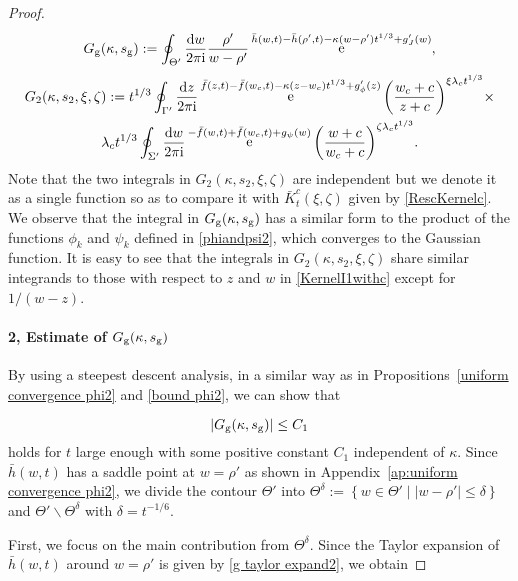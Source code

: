 \documentclass[cmp]{svjour}
\numberwithin{theorem}{section}
\numberwithin{equation}{section}
\DeclareMathOperator{\e}{e}
\def\dd{{\rm d}}
\def\ii{{\rm i}}
\begin{document}
\begin{proof}
\begin{equation}
\label{Gaussian_part}
G_{\rm g}(\kappa, s_{\rm g}) := \oint_{\Theta'} \frac{\dd w}{2 \pi \ii} \frac{\rho'}{w - \rho'}  \e^{\bar{h}(w,t)-\bar{h}(\rho',t) - \kappa (w - \rho') t^{1/3} + g'_J(w)},
\end{equation}
\begin{multline}
\label{Airy_parts}
G_2(\kappa, s_2, \xi , \zeta) := t^{1/3} \oint_{\Gamma'}  \frac{\dd z}{2 \pi \ii}  \e^{\bar{f}(z,t)-\bar{f}(w_c,t) - \kappa (z - w_c) t^{1/3} + g'_{\phi}(z)}  {\left( \frac{w_c + c}{z + c} \right)}^{\xi \lambda_c t^{1/3}} \times \\ \lambda_c t^{1/3} \oint_{\Sigma'} \frac{\dd w}{2 \pi \ii} \e^{-\bar{f}(w,t) + \bar{f}(w_c,t) + g_{\psi}(w)} {\left( \frac{w+c}{w_c + c} \right)}^{\zeta \lambda_c t^{1/3}}.
\end{multline}
Note that the two integrals in $G_2(\kappa, s_2 , \xi, \zeta)$ are independent but we denote it as a single function so as to compare it with $\bar{K}^c_{t}(\xi, \zeta)$ given by \eqref{RescKernelc}.
We observe that the integral in  $G_{\rm g}(\kappa, s_{\rm g})$ has a similar form to the product of the functions $\phi_k$ and $\psi_k$ defined in \eqref{phiandpsi2}, which converges to the Gaussian function.
It is easy to see that the integrals in $G_2(\kappa, s_2 , \xi, \zeta)$ share similar integrands to those with respect to $z$ and $w$ in \eqref{KernelI1withc} except for $1/(w - z)$.


\paragraph{2, Estimate of $G_{\rm g}(\kappa, s_{\rm g})$}

By using a steepest descent analysis, in a similar way as in Propositions~\ref{uniform convergence phi2} and \ref{bound phi2}, we can show that

\begin{equation}
\label{Gaussian_part_Bound}
\left| G_{\rm g}(\kappa , s_{\rm g}) \right| \leq C_1
\end{equation}
holds for $t$ large enough with some positive constant $C_1$ independent of $\kappa$.
Since $\bar{h}(w , t)$ has a saddle point at $w = \rho'$ as shown in Appendix~\ref{ap:uniform convergence phi2}, we divide the contour $\Theta'$ into $\Theta^\delta := \left\{ w \in \Theta' \mid |w - \rho'| \leq \delta \right\}$ and $\Theta' \backslash \Theta^\delta$ with $\delta = t^{-1/6}$.


First, we focus on the main contribution from $\Theta^\delta$.
Since the Taylor expansion of $\bar{h}(w,t)$ around $w = \rho'$ is given by \eqref{g taylor expand2}, we obtain



\end{proof}
\end{document}
